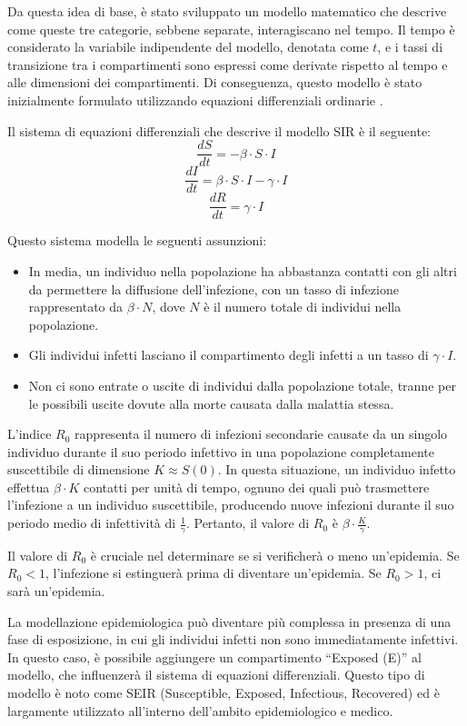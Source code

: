 Da questa idea di base, è stato sviluppato un modello matematico che 
descrive come queste tre categorie, sebbene separate, interagiscano 
nel tempo. Il tempo è considerato la variabile indipendente del modello, 
denotata come $t$, e i tassi di transizione tra i compartimenti sono 
espressi come derivate rispetto al tempo e alle dimensioni dei 
compartimenti. Di conseguenza, questo modello è stato inizialmente 
formulato utilizzando equazioni differenziali ordinarie \cite{Brauer2008}.

Il sistema di equazioni differenziali che descrive il modello SIR è il seguente:
\[ \frac{dS}{dt} = -\beta \cdot S \cdot I \]
\[ \frac{dI}{dt} = \beta \cdot S \cdot I - \gamma \cdot I \]
\[ \frac{dR}{dt} = \gamma \cdot I \]

Questo sistema modella le seguenti assunzioni:

\begin{itemize}
    \item In media, un individuo nella popolazione ha abbastanza contatti 
    con gli altri da permettere la diffusione dell'infezione, con un tasso 
    di infezione rappresentato da $\beta \cdot N$, dove $N$ è il numero 
    totale di individui nella popolazione.
    \item Gli individui infetti lasciano il compartimento degli infetti a 
    un tasso di $\gamma \cdot I$.
    \item Non ci sono entrate o uscite di individui dalla popolazione 
    totale, tranne per le possibili uscite dovute alla morte causata 
    dalla malattia stessa.
\end{itemize}

L'indice $R_0$ rappresenta il numero di infezioni secondarie causate da 
un singolo individuo durante il suo periodo infettivo in una popolazione 
completamente suscettibile di dimensione $K \approx S(0)$. In questa 
situazione, un individuo infetto effettua $\beta \cdot K$ contatti per 
unità di tempo, ognuno dei quali può trasmettere l'infezione a un 
individuo suscettibile, producendo nuove infezioni durante il suo periodo 
medio di infettività di $\frac{1}{\gamma}$. Pertanto, il valore 
di $R_0$ è $\beta \cdot \frac{K}{\gamma}$.

Il valore di $R_0$ è cruciale nel determinare se si verificherà o meno 
un'epidemia. Se $R_0 < 1$, l'infezione si estinguerà prima di diventare 
un'epidemia. Se $R_0 > 1$, ci sarà un'epidemia.

La modellazione epidemiologica può diventare più complessa in presenza 
di una fase di esposizione, in cui gli individui infetti non sono 
immediatamente infettivi. In questo caso, è possibile aggiungere un 
compartimento ``Exposed (E)'' al modello, che influenzerà il sistema di 
equazioni differenziali. Questo tipo di modello è noto come SEIR 
(Susceptible, Exposed, Infectious, Recovered) ed è largamente
utilizzato all'interno dell'ambito epidemiologico e medico.

